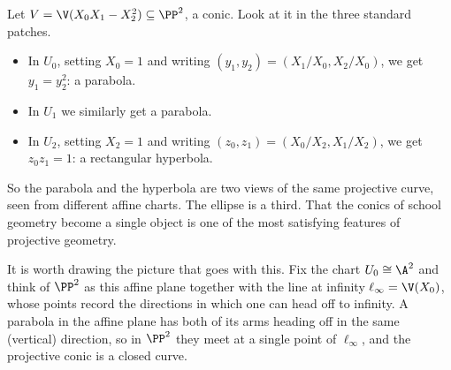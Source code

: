 \begin{example}\label{ex:conicpatches}
	Let $V = \V(X_0X_1 - X_2^2) \subseteq \PP^2$, a conic. Look at it in the three standard patches.
	\begin{itemize}
		\item In $U_0$, setting $X_0 = 1$ and writing $(y_1,y_2) = (X_1/X_0, X_2/X_0)$, we get $y_1 = y_2^2$: a parabola.
		\item In $U_1$ we similarly get a parabola.
		\item In $U_2$, setting $X_2 = 1$ and writing $(z_0,z_1) = (X_0/X_2, X_1/X_2)$, we get $z_0z_1 = 1$: a rectangular hyperbola.
	\end{itemize}
	So the parabola and the hyperbola are two views of the same projective curve, seen from different affine charts. The ellipse is a third. That the conics of school geometry become a single object is one of the most satisfying features of projective geometry.
\end{example}

It is worth drawing the picture that goes with this. Fix the chart $U_0 \cong \A^2$ and think of $\PP^2$ as this affine plane together with the line at infinity $\ell_\infty = \V(X_0)$, whose points record the directions in which one can head off to infinity. A parabola in the affine plane has both of its arms heading off in the same (vertical) direction, so in $\PP^2$ they meet at a single point of $\ell_\infty$, and the projective conic is a closed curve.

\begin{center}
\end{center}

